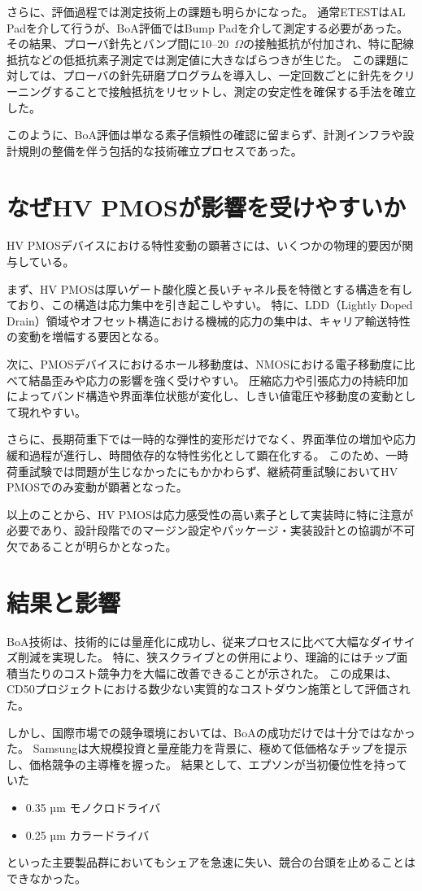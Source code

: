 \documentclass[conference]{IEEEtran}
\begin{document}
さらに、評価過程では測定技術上の課題も明らかになった。  
通常ETESTはAL Padを介して行うが、BoA評価ではBump Padを介して測定する必要があった。  
その結果、プローバ針先とバンプ間に10--20~$\Omega$の接触抵抗が付加され、特に配線抵抗などの低抵抗素子測定では測定値に大きなばらつきが生じた。  
この課題に対しては、プローバの針先研磨プログラムを導入し、一定回数ごとに針先をクリーニングすることで接触抵抗をリセットし、測定の安定性を確保する手法を確立した。  

このように、BoA評価は単なる素子信頼性の確認に留まらず、計測インフラや設計規則の整備を伴う包括的な技術確立プロセスであった。

\section{なぜHV PMOSが影響を受けやすいか}
HV PMOSデバイスにおける特性変動の顕著さには、いくつかの物理的要因が関与している。  

まず、HV PMOSは厚いゲート酸化膜と長いチャネル長を特徴とする構造を有しており、この構造は応力集中を引き起こしやすい。  
特に、LDD（Lightly Doped Drain）領域やオフセット構造における機械的応力の集中は、キャリア輸送特性の変動を増幅する要因となる。  

次に、PMOSデバイスにおけるホール移動度は、NMOSにおける電子移動度に比べて結晶歪みや応力の影響を強く受けやすい。  
圧縮応力や引張応力の持続印加によってバンド構造や界面準位状態が変化し、しきい値電圧や移動度の変動として現れやすい。  

さらに、長期荷重下では一時的な弾性的変形だけでなく、界面準位の増加や応力緩和過程が進行し、時間依存的な特性劣化として顕在化する。  
このため、一時荷重試験では問題が生じなかったにもかかわらず、継続荷重試験においてHV PMOSでのみ変動が顕著となった。  

以上のことから、HV PMOSは応力感受性の高い素子として実装時に特に注意が必要であり、設計段階でのマージン設定やパッケージ・実装設計との協調が不可欠であることが明らかとなった。

\section{結果と影響}
BoA技術は、技術的には量産化に成功し、従来プロセスに比べて大幅なダイサイズ削減を実現した。  
特に、狭スクライブとの併用により、理論的にはチップ面積当たりのコスト競争力を大幅に改善できることが示された。  
この成果は、CD50プロジェクトにおける数少ない実質的なコストダウン施策として評価された。

しかし、国際市場での競争環境においては、BoAの成功だけでは十分ではなかった。  
Samsungは大規模投資と量産能力を背景に、極めて低価格なチップを提示し、価格競争の主導権を握った。  
結果として、エプソンが当初優位性を持っていた
\begin{itemize}
  \item 0.35 µm モノクロドライバ
  \item 0.25 µm カラードライバ
\end{itemize}
といった主要製品群においてもシェアを急速に失い、競合の台頭を止めることはできなかった。
\end{document}
